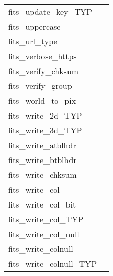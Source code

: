 \documentclass[11pt]{book}
\begin{document}
\begin{tabular}{lr}
fits\_update\_key\_TYP    & \pageref{ffukyx} \\
fits\_uppercase      & \pageref{ffupch} \\
fits\_url\_type      & \pageref{ffurlt} \\
fits\_verbose\_https  & \pageref{ffvhtps} \\
fits\_verify\_chksum  & \pageref{ffvcks} \\
fits\_verify\_group  & \pageref{ffgtvf} \\
fits\_world\_to\_pix & \pageref{ffxypx} \\
fits\_write\_2d\_TYP   & \pageref{ffp2dx} \\
fits\_write\_3d\_TYP   & \pageref{ffp3dx} \\
fits\_write\_atblhdr      & \pageref{ffphtb} \\
fits\_write\_btblhdr      & \pageref{ffphbn} \\
fits\_write\_chksum   & \pageref{ffpcks} \\
fits\_write\_col         & \pageref{ffpcl} \\
fits\_write\_col\_bit     & \pageref{ffpclx} \\
fits\_write\_col\_TYP     & \pageref{ffpcls} \\
fits\_write\_col\_null      & \pageref{ffpclu} \\
fits\_write\_colnull      & \pageref{ffpcn} \\
fits\_write\_colnull\_TYP & \pageref{ffpcnx} \\
\end{tabular}
\newpage
\end{document}
